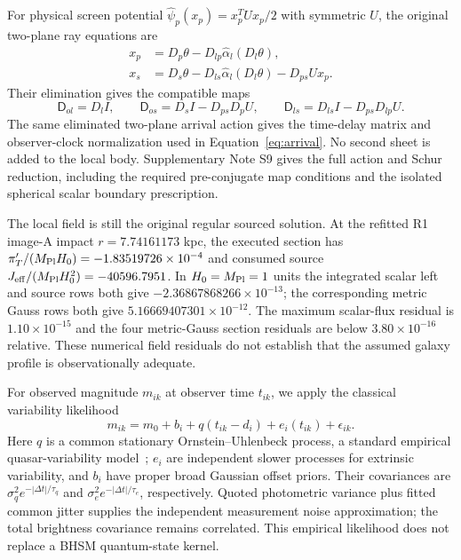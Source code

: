 For physical screen potential $\widehat\psi_p(x_p)=x_p^TUx_p/2$ with
symmetric $U$, the original two-plane ray equations are
\begin{align}
 x_p&=D_p\theta-D_{lp}\widehat\alpha_l(D_l\theta),\nonumber\\
 x_s&=D_s\theta-D_{ls}\widehat\alpha_l(D_l\theta)-D_{ps}Ux_p.
 \label{eq:observed-two-plane}
\end{align}
Their elimination gives the compatible maps
\begin{equation}
 \mathsf D_{ol}=D_lI,\qquad
 \mathsf D_{os}=D_sI-D_{ps}D_pU,\qquad
 \mathsf D_{ls}=D_{ls}I-D_{ps}D_{lp}U.
 \label{eq:observed-screen-maps}
\end{equation}
The same eliminated two-plane arrival action gives the time-delay matrix
and observer-clock normalization used in Equation~\eqref{eq:arrival}.
No second sheet is added to the local body. Supplementary Note S9 gives
the full action and Schur reduction, including the required pre-conjugate
map conditions and the isolated spherical scalar boundary prescription.

The local field is still the original regular sourced solution. At the
refitted R1 image-A impact $r=7.74161173$ kpc, the executed section has
$\pi'_T/(M_{\rm Pl} H_0)=-1.83519726\times10^{-4}$ and consumed source
$J_{\rm eff}/(M_{\rm Pl} H_0^2)=-40596.7951$.
In $H_0=M_{\rm Pl}=1$ units the integrated scalar left and source
rows both give $-2.36867868266\times10^{-13}$; the corresponding metric
Gauss rows both give $5.16669407301\times10^{-12}$.
The maximum scalar-flux residual is $1.10\times10^{-15}$ and the four
metric-Gauss section residuals are below $3.80\times10^{-16}$ relative.
These numerical field residuals do not establish that the assumed galaxy
profile is observationally adequate.

For observed magnitude $m_{ik}$ at observer time $t_{ik}$, we apply the
classical variability likelihood
\begin{equation}
 m_{ik}=m_0+b_i+q(t_{ik}-d_i)+e_i(t_{ik})+\epsilon_{ik}.
 \label{eq:observed-brightness}
\end{equation}
Here $q$ is a common stationary Ornstein--Uhlenbeck process, a standard
empirical quasar-variability model~\cite{Kelly2009}; $e_i$ are independent
slower processes for extrinsic variability, and $b_i$ have proper broad
Gaussian offset priors. Their covariances are
$\sigma_q^2e^{-|\Delta t|/\tau_q}$ and
$\sigma_e^2e^{-|\Delta t|/\tau_e}$, respectively. Quoted photometric
variance plus fitted common jitter supplies the independent measurement
noise approximation; the total brightness covariance remains correlated.
This empirical likelihood does not replace a BHSM quantum-state kernel.

